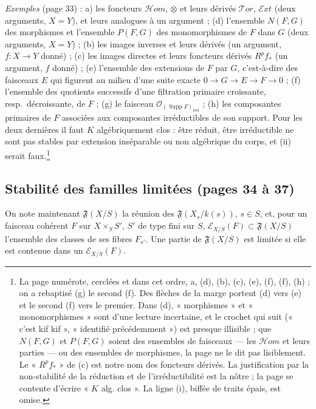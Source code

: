 \documentclass[11pt,a4paper]{article}
\begin{document}
\emph{Exemples} (page 33) : a) les foncteurs $\mathcal{H}om$, $\otimes$ et
leurs dérivés $\mathcal{T}or$, $\mathcal{E}xt$ (deux arguments, $X = Y$), et
leurs analogues à un argument ; (d) l'ensemble $N(F, G)$ des morphismes et
l'ensemble $P(F, G)$ des monomorphismes de $F$ dans $G$ (deux arguments,
$X = Y$) ; (b) les images inverses et leurs dérivés (un argument,
$f : X \to Y$ donné) ; (c) les images directes et leurs foncteurs dérivés
$R^{p}f_{*}$ (un argument, $f$ donné) ; (e) l'ensemble des extensions de
$F$ par $G$, c'est-à-dire des faisceaux $E$ qui figurent au milieu d'une
suite exacte $0 \to G \to E \to F \to 0$ ; (f) l'ensemble des quotients
successifs d'une filtration primaire croissante, resp.\ décroissante, de
$F$ ; (g) le faisceau $\mathcal{O}_{(\operatorname{Supp} F)_{\mathrm{red}}}$ ;
(h) les composantes primaires de $F$ associées aux composantes
irréductibles de son support. Pour les deux dernières il faut $K$
algébriquement clos : être réduit, être irréductible ne sont pas stables
par extension inséparable ou non algébrique du corps, et (ii) serait
faux.\footnote{La page numérote, cerclées et dans cet ordre, a, (d), (b),
(c), (e), (f), (f), (h) ; on a rebaptisé (g) le second (f). Des flèches
de la marge portent (d) vers (e) et le second (f) vers le premier. Dans
(d), « morphismes » et « monomorphismes » sont d'une lecture incertaine,
et le crochet qui suit (« c'est kif kif », « identifié précédemment ») est
presque illisible ; que $N(F, G)$ et $P(F, G)$ soient des ensembles de
faisceaux --- les $\mathcal{H}om$ et leurs parties --- ou des ensembles de
morphismes, la page ne le dit pas lisiblement. Le « $R^{p}f_{*}$ » de (c)
est notre nom des foncteurs dérivés. La justification par la
non-stabilité de la réduction et de l'irréductibilité est la nôtre ; la
page se contente d'écrire « $K$ alg. clos ». La ligne (i), biffée de
traits épais, est omise.}

\subsection*{Stabilité des familles limitées (pages 34 à 37)}

On note maintenant $\mathfrak{F}(X/S)$ la réunion des $\mathfrak{F}(X_s/k(s))$,
$s \in S$, et, pour un faisceau cohérent $F$ sur $X \times_S S'$, $S'$ de type
fini sur $S$, $\mathcal{E}_{X/S}(F) \subset \mathfrak{F}(X/S)$ l'ensemble
des classes de ses fibres $F_{s'}$. Une partie de $\mathfrak{F}(X/S)$ est
limitée si elle est contenue dans un $\mathcal{E}_{X/S}(F)$.
\end{document}
